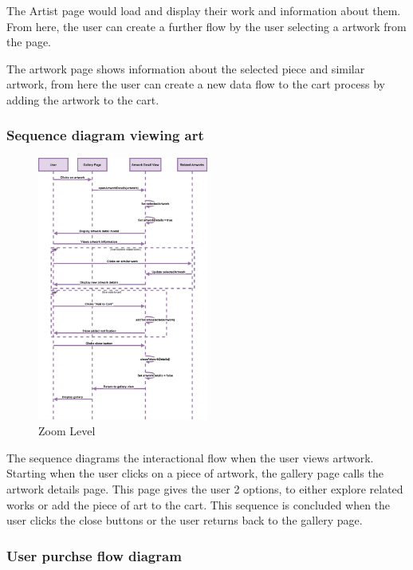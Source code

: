 \documentclass[]{project_final}
\begin{document}
The Artist page would load and display their work and information about them. From here, the user can create a further flow by the user selecting a artwork from the page.

The artwork page shows information about the selected piece and similar artwork, from here the user can create a new data flow to the cart process by adding the artwork to the cart.


\newpage
\subsubsection{Sequence diagram viewing art}

\begin{figure}[ht!]
  \centering
  \includegraphics[width=0.5\textwidth]{AGSequenceDiagramViewingArtWork.png}
  \vspace*{0.0cm}
  \caption{Zoom Level}
  \label{fig:1}
\end{figure}
The sequence diagrams the interactional flow when the user views artwork. Starting when the user clicks on a piece of artwork, the gallery page calls the artwork details page. This page gives the user 2 options, to either explore related works or add the piece of art to the cart.
This sequence is concluded when the user clicks the close buttons or the user returns back to the gallery page.
\newpage
\subsubsection{User purchse flow diagram}
\end{document}
